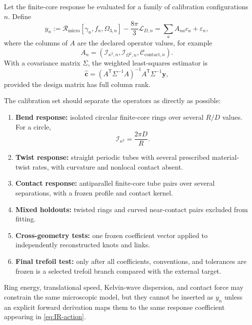 \documentclass[aps,pre,preprint,notitlepage,nofootinbib,superscriptaddress]{revtex4-2}
\newcommand{\calL}{\mathcal L}
\newcommand{\calI}{\mathcal I}
\newcommand{\calC}{\mathcal C}
\newcommand{\Rmicro}{\mathscr R_{\mathrm{micro}}}
\begin{document}
Let the finite-core response be evaluated for a family of calibration configurations $n$.  Define
\begin{equation}
  y_n:=\Rmicro[\gamma_n,f_n,\Omega_{3,n}]
      -\frac{8\pi}{3}\calL_{D,n}
      =\sum_a A_{na}c_a+\varepsilon_n,
  \label{eq:calibration}
\end{equation}
where the columns of $A$ are the declared operator values, for example
\begin{equation}
  A_n=(\calI_{\kappa^2,n},\calI_{\Omega^2,n},\calC_{\mathrm{contact},n}).
\end{equation}
With a covariance matrix $\Sigma$, the weighted least-squares estimator is
\begin{equation}
  \widehat{\bm c}
  =(A^{\mathsf T}\Sigma^{-1}A)^{-1}
    A^{\mathsf T}\Sigma^{-1}\bm y,
  \label{eq:wls}
\end{equation}
provided the design matrix has full column rank.

The calibration set should separate the operators as directly as possible:
\begin{enumerate}[label=\textbf{C\arabic*.},leftmargin=*]
  \item \textbf{Bend response:} isolated circular finite-core rings over several $R/D$ values.  For a circle,
  \begin{equation}
    \calI_{\kappa^2}=\frac{2\pi D}{R}.
  \end{equation}
  \item \textbf{Twist response:} straight periodic tubes with several prescribed material-twist rates, with curvature and nonlocal contact absent.
  \item \textbf{Contact response:} antiparallel finite-core tube pairs over several separations, with a frozen profile and contact kernel.
  \item \textbf{Mixed holdouts:} twisted rings and curved near-contact pairs excluded from fitting.
  \item \textbf{Cross-geometry tests:} one frozen coefficient vector applied to independently reconstructed knots and links.
  \item \textbf{Final trefoil test:} only after all coefficients, conventions, and tolerances are frozen is a selected trefoil branch compared with the external target.
\end{enumerate}

Ring energy, translational speed, Kelvin-wave dispersion, and contact force may constrain the same microscopic model, but they cannot be inserted as $y_n$ unless an explicit forward derivation maps them to the same response coefficient appearing in \cref{eq:IR-action}.
\end{document}
